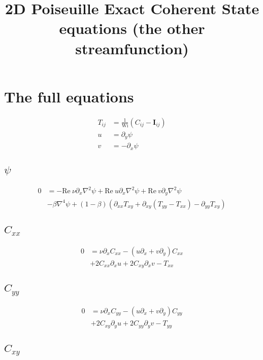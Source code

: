 \documentclass[12,a4paper]{article}
\newcommand{\dd}[1]{\partial_{#1}}
\newcommand{\lpl}{\nabla^{2}}
\newcommand{\bih}{\nabla^{4}}
\newcommand{\Wi}{\mathrm{Wi}}
\newcommand{\Rey}{\mathrm{Re \ }}
\newcommand{\II}{\mathbf{I}}
\begin{document}
\title{2D Poiseuille Exact Coherent State equations (the other streamfunction)}
\maketitle

\section{The full equations}
\begin{align}
    T_{ij} &= \frac{1}{\Wi} (C_{ij} - \II_{ij}) \\
    u	   &= \dd{y} \psi \\
    v	   &= -\dd{x} \psi
\end{align}

\subsection{$\psi$}

\begin{align}
    0 &= - \Rey\nu\dd{x}\lpl\psi + \Rey u \dd{x} \lpl \psi + \Rey v \dd{y} \lpl \psi \nonumber\\
      &- \beta \bih \psi + (1-\beta) \left( \dd{xx} T_{xy} + \dd{xy}(T_{yy} - T_{xx}) - \dd{yy} T_{xy}\right)
\end{align}

\subsection{$C_{xx}$}

\begin{align}
    0 &= \nu \dd{x} C_{xx} - (u\dd{x} + v\dd{y}) C_{xx} \nonumber\\
      &+ 2C_{xx}\dd{x}u + 2C_{xy}\dd{x}v -  T_{xx}
\end{align}

\subsection{$C_{yy}$}

\begin{align}
    0 &= \nu \dd{x} C_{yy} - (u\dd{x} + v\dd{y}) C_{yy} \nonumber\\
    &+ 2C_{xy} \dd{y}u + 2C_{yy}\dd{y}v - T_{yy}
\end{align}

\subsection{$C_{xy}$}
\end{document}
